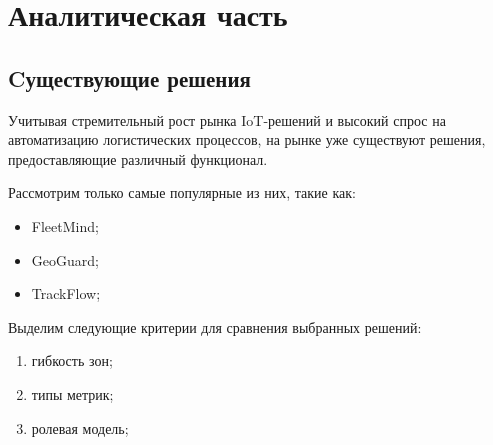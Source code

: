 \newpage
\chapter{Аналитическая часть}

\section{Cуществующие решения}

Учитывая стремительный рост рынка IoT-решений и высокий спрос на автоматизацию логистических процессов, на рынке уже существуют решения, предоставляющие различный функционал.

Рассмотрим только самые популярные из них, такие как:

\begin{itemize}
	\item FleetMind;
	\item GeoGuard;
	\item TrackFlow;
\end{itemize}

Выделим следующие критерии для сравнения выбранных решений:

\begin{enumerate}
	\item гибкость зон;
	\item типы метрик;
	\item ролевая модель;
\end{enumerate}


